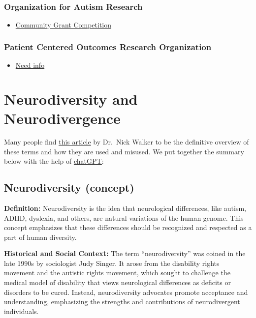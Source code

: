 \documentclass[
  letterpaper,
  DIV=11,
  numbers=noendperiod]{scrreprt}
\providecommand{\tightlist}{%
  \setlength{\itemsep}{0pt}\setlength{\parskip}{0pt}}\usepackage{longtable,booktabs,array}
\begin{document}
\subsection{Organization for Autism
Research}\label{organization-for-autism-research}

\begin{itemize}
\tightlist
\item
  \href{https://researchautism.smapply.org/prog/community_grant/}{Community
  Grant Competition}
\end{itemize}

\subsection{Patient Centered Outcomes Research
Organization}\label{patient-centered-outcomes-research-organization}

\begin{itemize}
\tightlist
\item
  \href{https://www.pcori.org/}{Need info}
\end{itemize}

\chapter{Neurodiversity and Neurodivergence}\label{sec-neurodiversity}

Many people find
\href{https://neuroqueer.com/neurodiversity-terms-and-definitions/}{\ul{this
article}} by Dr.~Nick Walker to be the definitive overview of these
terms and how they are used and misused. We put together the summary
below with the help of
\href{https://chatgpt.com/share/e60ffdec-5945-45d2-9a14-2abe39cf4f8d}{\ul{chatGPT}}:

\section{Neurodiversity (concept)}\label{neurodiversity-concept}

\textbf{Definition:} Neurodiversity is the idea that neurological
differences, like autism, ADHD, dyslexia, and others, are natural
variations of the human genome. This concept emphasizes that these
differences should be recognized and respected as a part of human
diversity.

\textbf{Historical and Social Context:} The term ``neurodiversity'' was
coined in the late 1990s by sociologist Judy Singer. It arose from the
disability rights movement and the autistic rights movement, which
sought to challenge the medical model of disability that views
neurological differences as deficits or disorders to be cured. Instead,
neurodiversity advocates promote acceptance and understanding,
emphasizing the strengths and contributions of neurodivergent
individuals.
\end{document}
